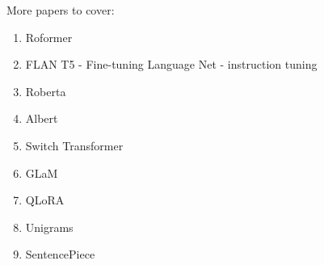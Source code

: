 \documentclass[11pt]{article}
\theoremstyle{definition}
\begin{document}
More papers to cover:

\begin{enumerate}
\item Roformer
\item FLAN T5 - Fine-tuning Language Net - instruction tuning
\item Roberta
\item Albert
\item Switch Transformer
\item GLaM
\item QLoRA
\item Unigrams
\item SentencePiece
\end{enumerate}


\end{document}
